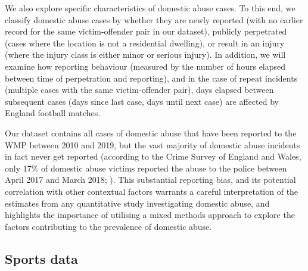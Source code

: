 \documentclass[12pt, a4paper]{article}
\begin{document}
We also explore specific characteristics of domestic abuse cases. To this end, we classify domestic abuse cases by whether they are newly reported (with no earlier record for the same victim-offender pair in our dataset), publicly perpetrated (cases where the location is not a residential dwelling), or result in an injury (where the injury class is either minor or serious injury). In addition, we will examine how reporting behaviour (measured by the number of hours elapsed between time of perpetration and reporting), and in the case of repeat incidents (multiple cases with the same victim-offender pair), days elapsed between subsequent cases (days since last case, days until next case) are affected by England football matches.



Our dataset contains all cases of domestic abuse that have been reported to the WMP between 2010 and 2019, but the vast majority of domestic abuse incidents in fact never get reported (according to the Crime Survey of England and Wales, only 17\% of domestic abuse victims reported the abuse to the police between April 2017 and March 2018; ). This substantial reporting bias, and its potential correlation with other contextual factors warrants a careful interpretation of the estimates from any quantitative study investigating domestic abuse, and highlights the importance of utilising a mixed methods approach to explore the factors contributing to the prevalence of domestic abuse. 
  
 \subsection{Sports data}
 
\end{document}
